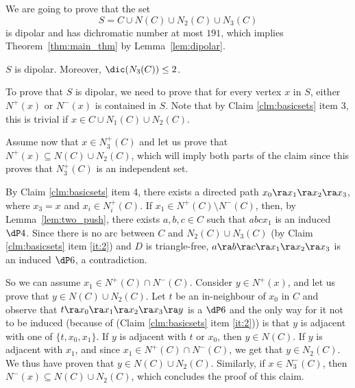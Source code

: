 We are going to prove that the set 
$$S= C \cup N(C) \cup N_{2}(C) \cup N_{3}(C)$$ 
is dipolar and has dichromatic number at most $191$, which implies Theorem~\ref{thm:main_thm} by Lemma~\ref{lem:dipolar}. %



\begin{claim}\label{clm:Sdipo}
$S$ is dipolar. Moreover, $\dic(N_{3}(C)) \leq 2$. 
\end{claim}

\begin{subproof}
To prove that $S$ is dipolar, we need to prove that for every vertex $x$ in $S$, either $N^+(x)$ or $N^-(x)$ is contained in $S$. Note that by Claim \ref{clm:basicsets} item 3, this is trivial if $x\in C\cup N_1(C) \cup N_2(C)$. 

Assume now that  $x \in N^{+}_3(C)$ and let us prove that $N^+(x) \subseteq N(C) \cup N_{2}(C)$, which will imply both parts of the claim since this proves that $N^+_3(C)$ is an independent set.  

By Claim \ref{clm:basicsets} item 4, there exists a directed path $x_0\ra x_1\ra x_2\ra x_3$, where $x_3=x$ and $x_i\in N^+_i(C)$. If $x_1 \in N^{+}(C) \setminus N^{-}(C)$, then, by Lemma~\ref{lem:two_push}, there exists $a,b,c \in C$ such that $abcx_1$ is an induced $\dP4$. Since there is no arc between $C$ and $N_{2}(C) \cup N_{3}(C)$ (by Claim \ref{clm:basicsets} item \ref{it:2}) and $D$ is triangle-free, $a\ra b\ra c\ra x_1\ra x_2\ra x_3$ is an induced $\dP6$, a contradiction. 

So we can assume $x_1 \in N^{+}(C) \cap N^{-}(C)$. Consider $y\in N^+(x)$, and let us prove that $y\in N(C) \cup N_2(C)$. Let $t$ be an in-neighbour of $x_0$ in $C$ and observe that $t\ra x_0\ra x_1\ra x_2\ra x_3\ra y$ is a $\dP6$ and the only way for it not to be induced (because of (Claim \ref{clm:basicsets} item \ref{it:2})) is that $y$ is adjacent with one of $\{t,x_0,x_1\}$. If $y$ is adjacent with $t$ or $x_0$, then $y \in N(C)$. If $y$ is adjacent with $x_1$, and since $x_1 \in N^{+}(C) \cap N^{-}(C)$, we get that $y \in  N_{2}(C)$. We thus have proven that $y\in N(C) \cup N_2(C)$. Similarly, if $x \in N^{-}_3(C)$, then $N^-(x) \subseteq N(C) \cup N_{2}(C)$, which concludes the proof of this claim.

\end{subproof}

